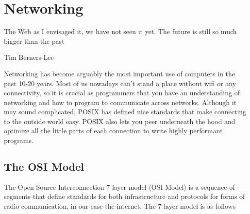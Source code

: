 \chapter{Networking}

\epigraph{The Web as I envisaged it, we have not seen it yet.
  The future is still so much bigger than the past}{Tim Berners-Lee}

Networking has become arguably the most important use of computers in the past 10-20 years.
Most of us nowadays can't stand a place without wifi or any connectivity, so it is crucial as programmers that you have an understanding of networking and how to program to communicate across networks.
Although it may sound complicated, POSIX has defined nice standards that make connecting to the outside world easy.
POSIX also lets you peer underneath the hood and optimize all the little parts of each connection to write highly performant programs.

\section{The OSI Model}

The Open Source Interconnection 7 layer model (OSI Model) is a sequence of segments that define standards for both infrastructure and protocols for forms of radio communication, in our case the internet.
The 7 layer model is as follows

